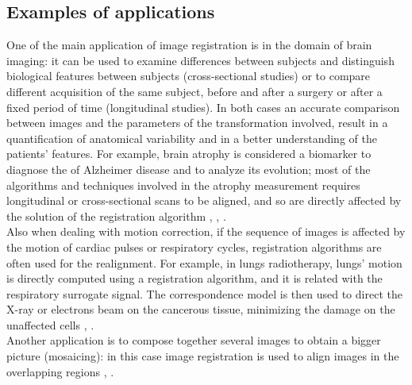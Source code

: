 \subsection{Examples of applications}
One of the main application of image registration is in the domain of brain imaging: it can be used to examine differences between subjects and distinguish biological features between subjects (cross-sectional studies) or to compare different acquisition of the same subject, before and after a surgery or after a fixed period of time (longitudinal studies). In both cases an accurate comparison between images and the parameters of the transformation involved, result in a quantification of anatomical variability and in a better understanding of the patients' features. 
%
For example, brain atrophy is considered a biomarker to diagnose the of Alzheimer disease and to analyze its evolution; most of the algorithms and techniques involved in the atrophy measurement requires longitudinal or cross-sectional scans to be aligned, and so are directly affected by the solution of the registration algorithm \cite{fox1997brain}, \cite{gauthier2012prevention}, \cite{prados2015measuring}. \\
Also when dealing with motion correction, if the sequence of images is affected by the motion of cardiac pulses or respiratory cycles, registration algorithms are often used for the realignment. 
For example, in lungs radiotherapy, lungs' motion is directly computed using a registration algorithm, and it is related with the respiratory surrogate signal. The correspondence model is then used to direct the X-ray or electrons beam on the cancerous tissue, minimizing the damage on the unaffected cells \cite{mcclelland}, \cite{mcclelland2011inter}.\\
Another application is to compose together several images to obtain a bigger picture (mosaicing): in this case image registration is used to align images in the overlapping regions \cite{vercauteren2006robust}, \cite{szeliski1994image}.

